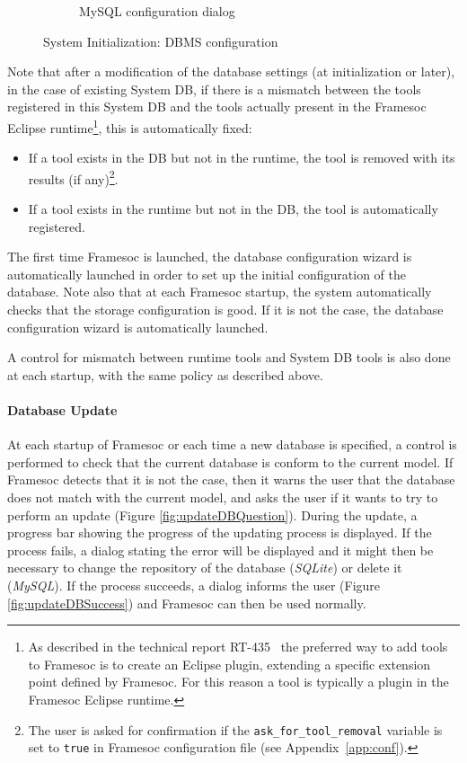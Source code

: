 \documentclass[twoside]{article}
\begin{document}
\begin{sloppypar}
\begin{figure}[h!]
\begin{subfigure}[c]{0.46\textwidth}
    \caption{MySQL configuration dialog}
    \label{fig:dbms_configuration_mysql}         
 \end{subfigure}
 \caption{System Initialization: DBMS configuration}
 \label{fig:dbms_configuration}       
\end{figure}

Note that after a modification of the database settings (at initialization or later), in the case of existing System DB, if there is a mismatch between the tools registered in this System DB and the tools actually present in the Framesoc Eclipse runtime\footnote{As described in the technical report RT-435~\cite{pagano:hal-00830008} the preferred way to add tools to Framesoc is to create an Eclipse plugin, extending a specific extension point defined by Framesoc. For this reason a tool is typically a plugin in the Framesoc Eclipse runtime.}, this is automatically fixed:
\begin{itemize}
 \item If a tool exists in the DB but not in the runtime, the tool is removed with its results (if any)\footnote{The user is asked for confirmation if the \texttt{ask\_for\_tool\_removal} variable is set to \texttt{true} in Framesoc configuration file (see Appendix~\ref{app:conf}).}.
 \item If a tool exists in the runtime but not in the DB, the tool is automatically registered.
\end{itemize}

The first time Framesoc is launched, the database configuration wizard is automatically launched in order to set up the initial configuration of the database.
Note also that at each Framesoc startup, the system automatically checks that the storage configuration is good. 
If it is not the case, the database configuration wizard is automatically launched.

A control for mismatch between runtime tools and System DB tools is also done at each startup, with the same policy as described above.

\paragraph{Database Update}
At each startup of Framesoc or each time a new database is specified, a control is performed to check that the current database is conform to the current model. If Framesoc detects that it is not the case, then it warns the user that the database does not match with the current model, and asks the user if it wants to try to perform an update (Figure \ref{fig:updateDBQuestion}). During the update, a progress bar showing the progress of the updating process is displayed. If the process fails, a dialog stating the error will be displayed and it might then be necessary to change the repository of the database (\emph{SQLite}) or delete it (\emph{MySQL}). If the process succeeds, a dialog informs the user (Figure \ref{fig:updateDBSuccess}) and Framesoc can then be used normally.


\end{sloppypar}
\end{document}
